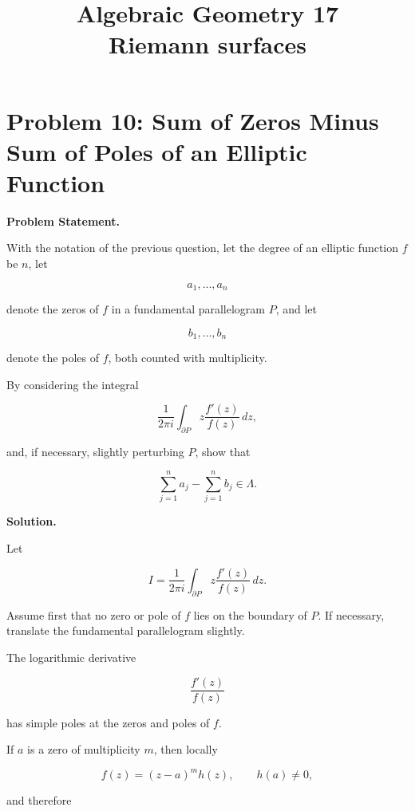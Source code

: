 \documentclass[12pt,a4paper]{article}
\theoremstyle{notespace}
\begin{document}
\title{Algebraic Geometry 17\\
	\large Riemann surfaces}
\author{}
\date{}

	\maketitle
	

	\setcounter{section}{0}

\tableofcontents

	\clearpage

\section{Problem 10: Sum of Zeros Minus Sum of Poles of an Elliptic Function}

\textbf{Problem Statement.}

With the notation of the previous question, let the degree of an elliptic function \(f\) be \(n\), let

\[
a_1,\dots,a_n
\]

denote the zeros of \(f\) in a fundamental parallelogram \(P\), and let

\[
b_1,\dots,b_n
\]

denote the poles of \(f\), both counted with multiplicity.

By considering the integral

\[
\frac{1}{2\pi i}
\int_{\partial P}
z\frac{f'(z)}{f(z)}\,dz,
\]

and, if necessary, slightly perturbing \(P\), show that

\[
\sum_{j=1}^{n}a_j-\sum_{j=1}^{n}b_j
\in \Lambda.
\]

\bigskip

\textbf{Solution.}

Let

\[
I=
\frac{1}{2\pi i}
\int_{\partial P}
z\frac{f'(z)}{f(z)}\,dz.
\]

Assume first that no zero or pole of \(f\) lies on the boundary of \(P\). If necessary, translate the fundamental parallelogram slightly.

The logarithmic derivative

\[
\frac{f'(z)}{f(z)}
\]

has simple poles at the zeros and poles of \(f\).

If \(a\) is a zero of multiplicity \(m\), then locally

\[
f(z)=(z-a)^m h(z),
\qquad
h(a)\neq 0,
\]

and therefore
\end{document}
